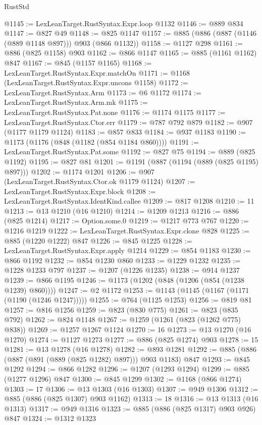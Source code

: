 \begin{lexlean}{RustStd}
\begin{coremodule}
@1145 := LexLeanTarget.RustSyntax.Expr.loop @1132
@1146 := @889 @834
@1147 := @827 @49
@1148 := @825 @1147
@1157 := @885 (@886 (@887 (@1146 (@889 @1148 @897))) @903 (@866 @1132))
@1158 := @1127 @298
@1161 := @886 (@825 @1158) @903
@1162 := @866 @1147
@1165 := @885 (@1161 @1162) @847
@1167 := @845 (@1157 @1165)
@1168 := LexLeanTarget.RustSyntax.Expr.matchOn
@1171 := @1168 (LexLeanTarget.RustSyntax.Expr.uncons @1158)
@1172 := LexLeanTarget.RustSyntax.Arm
@1173 := @6 @1172
@1174 := LexLeanTarget.RustSyntax.Arm.mk
@1175 := LexLeanTarget.RustSyntax.Pat.none
@1176 := @1174 @1175
@1177 := LexLeanTarget.RustSyntax.Ctor.err
@1179 := @787 @792 @879
@1182 := @907 (@1177 @1179 @1124)
@1183 := @857 @833
@1184 := @937 @1183
@1190 := @1173 (@1176 (@848 (@1182 (@854 @1184 @860))))
@1191 := LexLeanTarget.RustSyntax.Pat.some
@1192 := @827 @75
@1194 := @889 (@825 @1192)
@1195 := @827 @81
@1201 := @1191 (@887 (@1194 (@889 (@825 @1195) @897)))
@1202 := @1174 @1201
@1206 := @907 (LexLeanTarget.RustSyntax.Ctor.ok @1179 @1124)
@1207 := LexLeanTarget.RustSyntax.Expr.block
@1208 := LexLeanTarget.RustSyntax.IdentKind.callee
@1209 := @817 @1208
@1210 := 11
@1213 := @13 @1210 (@16 @1210)
@1214 := @1209 @1213
@1216 := @886 (@825 @1214)
@1217 := Option.some.{0}
@1219 := @1217 @773 @767
@1220 := @1216 @1219
@1222 := LexLeanTarget.RustSyntax.Expr.clone @828
@1225 := @885 (@1220 @1222) @847
@1226 := @845 @1225
@1228 := LexLeanTarget.RustSyntax.Expr.apply @1214
@1229 := @854 @1183
@1230 := @866 @1192
@1232 := @854 @1230 @860
@1233 := @1229 @1232
@1235 := @1228 @1233 @797
@1237 := @1207 (@1226 @1235)
@1238 := @914 @1237
@1239 := @866 @1195
@1246 := @1173 (@1202 (@848 (@1206 (@854 (@1238 @1239) @860))))
@1247 := @2 @1172
@1253 := @1143 (@1145 (@1167 (@1171 (@1190 (@1246 @1247)))))
@1255 := @764 (@1125 @1253)
@1256 := @819 @81
@1257 := @816 @1256
@1259 := @823 (@830 @775)
@1261 := @823 (@835 @792)
@1262 := @824 @1148
@1267 := @1259 (@1261 (@823 (@1262 @775) @838))
@1269 := @1257 @1267 @1124
@1270 := 16
@1273 := @13 @1270 (@16 @1270)
@1274 := @1127 @1273
@1277 := @886 (@825 @1274) @903
@1278 := 15
@1281 := @13 @1278 (@16 @1278)
@1282 := @893 @1281
@1292 := @885 (@886 (@887 (@891 (@889 (@825 @1282) @897))) @903 @1183) @847
@1293 := @845 @1292
@1294 := @866 @1282
@1296 := @1207 (@1293 @1294)
@1299 := @885 (@1277 @1296) @847
@1300 := @845 @1299
@1302 := @1168 (@866 @1274)
@1303 := 17
@1306 := @13 @1303 (@16 @1303)
@1307 := @949 @1306
@1312 := @885 (@886 (@825 @1307) @903 @1162)
@1313 := 18
@1316 := @13 @1313 (@16 @1313)
@1317 := @949 @1316
@1323 := @885 (@886 (@825 @1317) @903 @926) @847
@1324 := @1312 @1323

\end{coremodule}
\end{lexlean}
